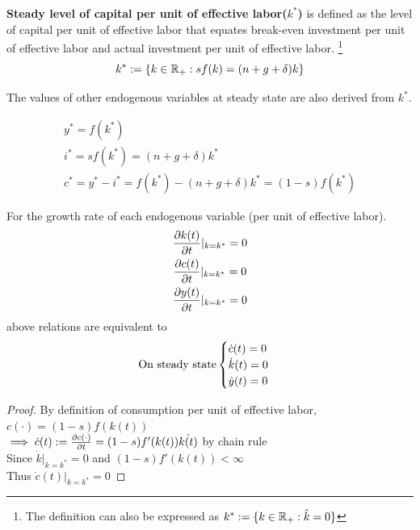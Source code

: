 \documentclass[]{article}
\begin{document}
			\begin{definition}
			\textbf{Steady level of capital per unit of effective labor($k^*$)} is defined as the level of capital per unit of effective labor that equates break-even investment per unit of effective labor and actual investment per unit of effective labor. \footnote{The definition can also be expressed as $k^* := \{k \in \mathbb{R}_{+}: \hat{k} = 0\}$}
				\[
					k^* := \{k \in \mathbb{R}_{+}: sf(k) = (n+g+\delta) k\}
				\]
			\end{definition}
			
			\begin{remark}
				The values of other endogenous variables at steady state are also derived from $k^*$.
				\begin{example}
					\begin{gather}
						y^* = f(k^*) \\
						i^* = sf(k^*) = (n+g+\delta) k^* \\
						c^* = y^* - i^* = f(k^*) - (n+g+\delta)k^* = (1-s)f(k^*)
					\end{gather}
				\end{example}
				For the growth rate of each endogenous variable (per unit of effective labor). 
					\begin{gather}
						\frac{\partial{k(t)}}{\partial{t}}|_{k=k^*} = 0 \\
						\frac{\partial{c(t)}}{\partial{t}}|_{k=k^*} = 0 \\
						\frac{\partial{y(t)}}{\partial{t}}|_{k=k^*} = 0 
					\end{gather}
					above relations are equivalent to 
					\begin{gather}
						\text{{On steady state}} \begin{cases}
							\dot{c}(t) = 0 \\
							\dot{k}(t) = 0 \\
							\dot{y}(t) = 0 \\
						\end{cases}
					\end{gather}
			\end{remark}
			
			\begin{proof}
				By definition of consumption per unit of effective labor,\\
				$c(\cdot) = (1-s)f(k(t))$ \\
				$\implies \dot{c}(t) := \frac{\partial{c(\cdot)}}{\partial{t}} = (1-s)f'(k(t)) \dot{k(t)}$ by chain rule \\
				Since $\dot{k}|_{k=k^*} = 0$ and $(1-s)f'(k(t)) < \infty$ \\
				Thus $\dot{c}(t)|_{k=k^*} = 0$
			\end{proof}
			
\end{document}
